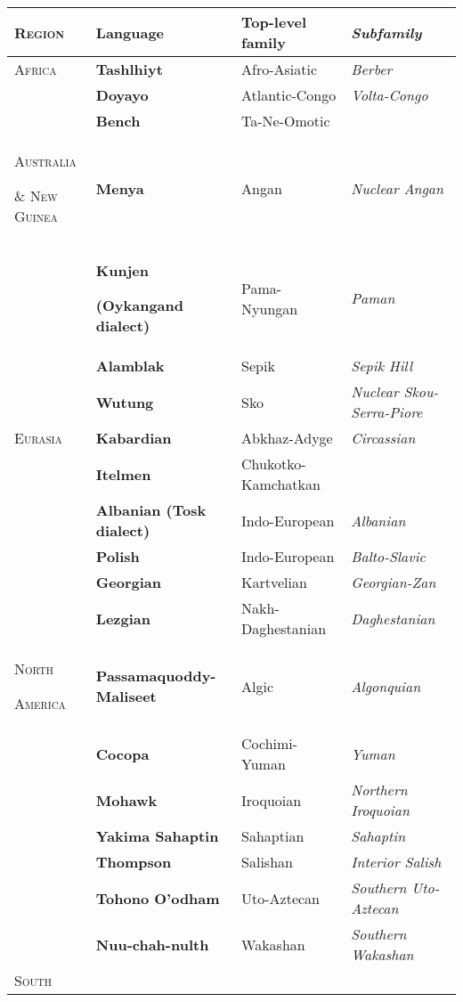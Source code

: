 \documentclass[12pt]{article}
\begin{document}
\begin{flushleft}
\tablefirsthead{}
\tablehead{}
\tabletail{}
\tablelasttail{}
\begin{supertabular}{m{1.2205598in}m{1.6719599in}m{1.6400598in}m{1.6420599in}}
\hline
{\bfseries\scshape Region} &
{\bfseries Language} &
{\bfseries Top-level family} &
{\bfseries\itshape Subfamily}\\\hline
{\scshape Africa} &
{\bfseries Tashlhiyt} &
Afro-Asiatic &
{\itshape Berber}\\\hhline{-~~~}
 &
{\bfseries Doyayo} &
Atlantic-Congo &
{\itshape Volta-Congo}\\
 &
{\bfseries Bench} &
Ta-Ne-Omotic &
\\\hline
{\scshape Australia }

{\scshape \& New Guinea} &
{\bfseries Menya} &
Angan &
{\itshape Nuclear Angan}\\\hhline{-~~~}
 &
{\bfseries Kunjen }

{\bfseries (Oykangand dialect)} &
Pama-Nyungan &
{\itshape Paman}\\
 &
{\bfseries Alamblak} &
Sepik &
{\itshape Sepik Hill}\\
 &
{\bfseries Wutung} &
Sko &
{\itshape Nuclear Skou-Serra-Piore}\\\hline
{\scshape Eurasia} &
{\bfseries Kabardian} &
Abkhaz-Adyge &
{\itshape Circassian}\\\hhline{-~~~}
 &
{\bfseries Itelmen} &
Chukotko-Kamchatkan &
\\
 &
{\bfseries Albanian (Tosk dialect)} &
Indo-European &
{\itshape Albanian}\\
 &
{\bfseries Polish} &
Indo-European &
{\itshape Balto-Slavic}\\
 &
{\bfseries Georgian} &
Kartvelian &
{\itshape Georgian-Zan}\\
 &
{\bfseries Lezgian} &
Nakh-Daghestanian &
{\itshape Daghestanian}\\\hline
{\scshape North }

{\scshape America} &
{\bfseries Passamaquoddy-Maliseet} &
Algic &
{\itshape Algonquian}\\\hhline{-~~~}
 &
{\bfseries Cocopa} &
Cochimi-Yuman &
{\itshape Yuman}\\
 &
{\bfseries Mohawk} &
Iroquoian &
{\itshape Northern Iroquoian}\\
 &
{\bfseries Yakima Sahaptin} &
Sahaptian &
{\itshape Sahaptin}\\
 &
{\bfseries Thompson} &
Salishan &
{\itshape Interior Salish}\\
 &
{\bfseries Tohono O’odham} &
Uto-Aztecan &
{\itshape Southern Uto-Aztecan}\\
 &
{\bfseries Nuu-chah-nulth} &
Wakashan &
{\itshape Southern Wakashan}\\\hline
{\scshape South }


\end{supertabular}
\end{flushleft}
\end{document}
